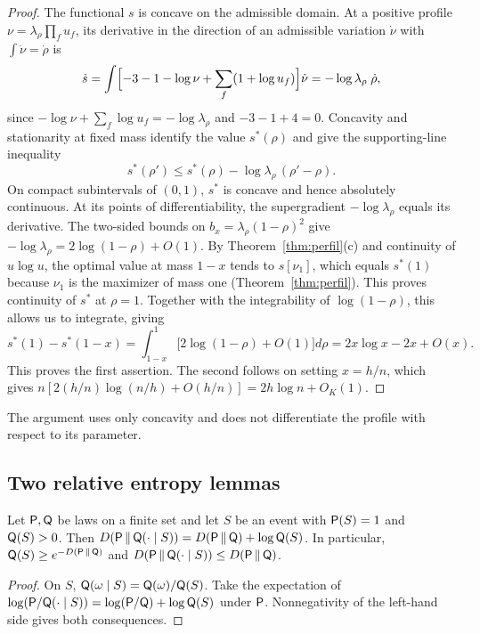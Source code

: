 \begin{proof} The functional $s$ is concave on the admissible domain. At a positive profile
$\nu=\lambda_\rho\prod_fu_f$, its
derivative in the direction of an admissible variation $\dot\nu$ with $\int\dot\nu=\dot\rho$ is \[
 \dot s=\int\Bigl[-3-1-\log\nu+\sum_f(1+\log u_f)\Bigr]\dot\nu=-\log\lambda_\rho\;\dot\rho ,
\] since $-\log\nu+\sum_f\log u_f=-\log\lambda_\rho$ and $-3-1+4=0$. Concavity and stationarity at fixed
mass identify the value
$s^*(\rho)$ and give the supporting-line inequality \[
 s^*(\rho')\le s^*(\rho)-\log\lambda_\rho\,(\rho'-\rho).
\] On compact subintervals of $(0,1)$, $s^*$ is concave and hence absolutely continuous. At its points of
differentiability, the
supergradient $-\log\lambda_\rho$ equals its derivative. The two-sided bounds on
$b_x=\lambda_\rho(1-\rho)^2$ give
$-\log\lambda_\rho=2\log(1-\rho)+O(1)$. By Theorem~\ref{thm:perfil}(c) and continuity of $u\log u$, the
optimal value at mass $1-x$
tends to $s[\nu_1]$, which equals $s^*(1)$ because $\nu_1$ is the maximizer of mass one
(Theorem~\ref{thm:perfil}). This proves
continuity of $s^*$ at $\rho=1$. Together with the integrability of $\log(1-\rho)$, this allows us to
integrate, giving \[
 s^*(1)-s^*(1-x)=\int_{1-x}^1\bigl[2\log(1-\rho)+O(1)\bigr]d\rho=2x\log x-2x+O(x).
\] This proves the first assertion. The second follows on setting $x=h/n$, which gives
$n[2(h/n)\log(n/h)+O(h/n)]=2h\log n+O_K(1)$. \end{proof}

The argument uses only concavity and does not differentiate the profile with respect to its parameter.

\subsection{Two relative entropy lemmas}

\begin{lema}\label{lem:exito} Let $\mathsf{P},\mathsf{Q}$ be laws on a finite set and let $S$ be
an event with $\mathsf{P}(S)=1$
and $\mathsf{Q}(S)>0$. Then $D(\mathsf{P}\,\Vert\,\mathsf{Q}(\cdot\mid S))=D(\mathsf{P}\,\Vert\,\mathsf{Q})+\log\mathsf{Q}(S)$. In particular,
$\mathsf{Q}(S)\ge e^{-D(\mathsf{P}\,\Vert\,\mathsf{Q})}$ and
$D(\mathsf{P}\,\Vert\,\mathsf{Q}(\cdot\mid S))\le D(\mathsf{P}\,\Vert\,\mathsf{Q})$. \end{lema}

\begin{proof} On $S$, $\mathsf{Q}(\omega\mid S)=\mathsf{Q}(\omega)/\mathsf{Q}(S)$. Take the expectation of
$\log(\mathsf{P}/\mathsf{Q}(\cdot\mid
S))=\log(\mathsf{P}/\mathsf{Q})+\log\mathsf{Q}(S)$ under $\mathsf{P}$. Nonnegativity of the left-hand side gives both consequences.
\end{proof}

